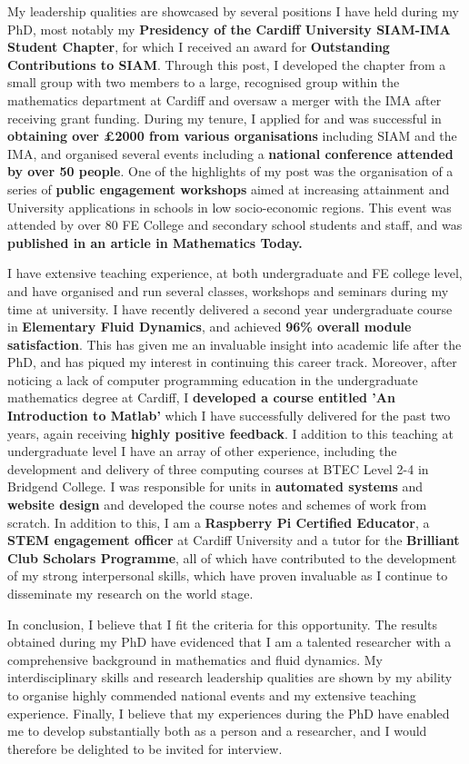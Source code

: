 \documentclass[11pt,a4paper,sans]{moderncv}        %
\begin{document}
My leadership qualities are showcased by several positions I have held during my PhD, most notably my \textbf{Presidency of the Cardiff University SIAM-IMA Student Chapter}, for which I received an award for \textbf{Outstanding Contributions to SIAM}. Through this post, I developed the chapter from a small group with two members to a large, recognised group within the mathematics department at Cardiff and oversaw a merger with the IMA after receiving grant funding. During my tenure, I applied for and was successful in \textbf{obtaining over £2000 from various organisations} including SIAM and the IMA, and organised several events including a \textbf{national conference attended by over 50 people}. One of the highlights of my post was the organisation of a series of \textbf{public engagement workshops} aimed at increasing attainment and University applications in schools in low socio-economic regions. This event was attended by over 80 FE College and secondary school students and staff, and was \textbf{published in an article in Mathematics Today.}

I have extensive teaching experience, at both undergraduate and FE college level, and have organised and run several classes, workshops and seminars during my time at university. I have recently delivered a second year undergraduate course in \textbf{Elementary Fluid Dynamics}, and achieved \textbf{96\% overall module satisfaction}. This has given me an invaluable insight into academic life after the PhD, and has piqued my interest in continuing this career track. Moreover, after noticing a lack of computer programming education in the undergraduate mathematics degree at Cardiff, I \textbf{developed a course entitled 'An Introduction to Matlab'} which I have successfully delivered for the past two years, again receiving \textbf{highly positive feedback}. I addition to this teaching at undergraduate level I have an array of other experience, including the development and delivery of three computing courses at BTEC Level 2-4 in Bridgend College. I was responsible for units in \textbf{automated systems} and \textbf{website design} and developed the course notes and schemes of work from scratch. In addition to this, I am a \textbf{Raspberry Pi Certified Educator}, a \textbf{STEM engagement officer} at Cardiff University and a tutor for the \textbf{Brilliant Club Scholars Programme}, all of which have contributed to the development of my strong interpersonal skills, which have proven invaluable as I continue to disseminate my research on the world stage.

In conclusion, I believe that I fit the criteria for this opportunity. The results obtained during my PhD have evidenced that I am a talented researcher with a comprehensive background in mathematics and fluid dynamics. My interdisciplinary skills and research leadership qualities are shown by my ability to organise highly commended national events and my extensive teaching experience. Finally, I believe that my experiences during the PhD have enabled me to develop substantially both as a person and a researcher, and I would therefore be delighted to be invited for interview. \newline

\makeletterclosing
\end{document}
